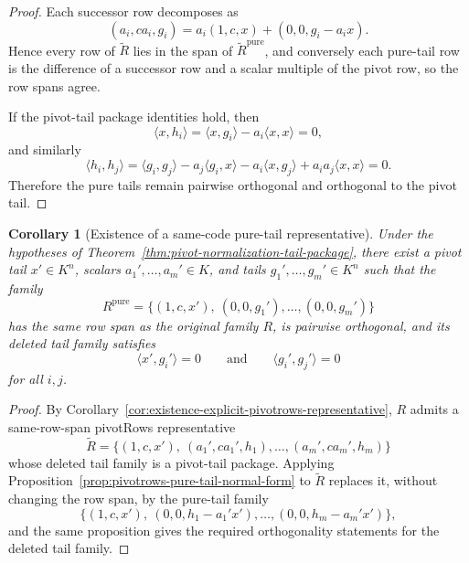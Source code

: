 \documentclass[12pt]{article}
\newtheorem{cor}[theorem]{Corollary}
\begin{document}
\begin{proof}
Each successor row decomposes as
\[
(a_i,c a_i,g_i) = a_i(1,c,x) + (0,0,g_i-a_i x).
\]
Hence every row of $\widetilde{R}$ lies in the span of $\widetilde{R}^{\mathrm{pure}}$, and conversely each pure-tail row is the difference of a successor row and a scalar multiple of the pivot row, so the row spans agree.

If the pivot-tail package identities hold, then
\[
\langle x,h_i\rangle
=
\langle x,g_i\rangle - a_i\langle x,x\rangle
=
0,
\]
and similarly
\[
\langle h_i,h_j\rangle
=
\langle g_i,g_j\rangle
- a_j\langle g_i,x\rangle
- a_i\langle x,g_j\rangle
+ a_i a_j \langle x,x\rangle
=
0.
\]
Therefore the pure tails remain pairwise orthogonal and orthogonal to the pivot tail.
\end{proof}

\begin{cor}[Existence of a same-code pure-tail representative]
\label{cor:existence-pure-tail-representative}
Under the hypotheses of Theorem~\ref{thm:pivot-normalization-tail-package}, there exist a pivot tail $x'\in K^n$, scalars $a_1',\dots,a_m'\in K$, and tails $g_1',\dots,g_m'\in K^n$ such that the family
\[
R^{\mathrm{pure}}
=
\{(1,c,x'),\ (0,0,g_1'),\dots,(0,0,g_m')\}
\]
has the same row span as the original family $R$, is pairwise orthogonal, and its deleted tail family satisfies
\[
\langle x',g_i'\rangle=0
\qquad\text{and}\qquad
\langle g_i',g_j'\rangle=0
\]
for all $i,j$.
\end{cor}

\begin{proof}
By Corollary~\ref{cor:existence-explicit-pivotrows-representative}, $R$ admits a same-row-span pivotRows representative
\[
\widetilde{R}
=
\{(1,c,x'),\ (a_1',c a_1',h_1),\dots,(a_m',c a_m',h_m)\}
\]
whose deleted tail family is a pivot-tail package. Applying Proposition~\ref{prop:pivotrows-pure-tail-normal-form} to $\widetilde{R}$ replaces it, without changing the row span, by the pure-tail family
\[
\{(1,c,x'),\ (0,0,h_1-a_1' x'),\dots,(0,0,h_m-a_m' x')\},
\]
and the same proposition gives the required orthogonality statements for the deleted tail family.
\end{proof}
\end{document}
